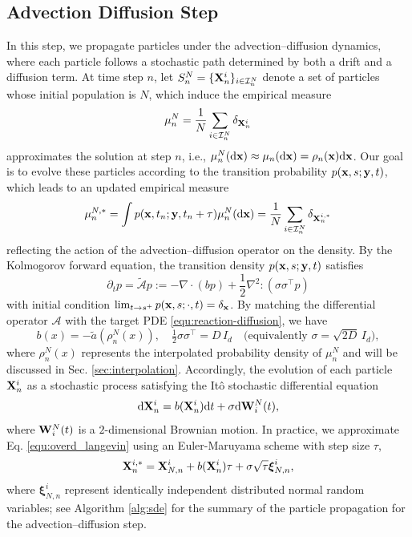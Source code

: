 \documentclass[a4paper,fleqn]{cas-sc}
\newcommand{\mhyphen}{\text{-}}
\theoremstyle{definition}
\theoremstyle{remark}
\begin{document}
\subsection{Advection Diffusion Step}
\label{sec:adevection_diffusion}
In this step, we propagate particles under the advection–diffusion dynamics, where each particle follows a stochastic path determined by both a drift and a diffusion term. At time step $n$, let $S^N_n = \{\mathbf{X}^i_n\}_{i\in \mathcal I^N_n}$ denote  a set of particles  whose initial population is $N$, which induce the empirical measure 
\[
\mu^N_n= \frac{1}{N}\sum_{i\in \mathcal I^N_n}\delta_{\mathbf{X}^i_n}
\] 
approximates the solution at step $n$, i.e.,  $\mu^N_n (\mathrm{d} \mathbf{x}) \approx \mu_n(\mathrm{d} \mathbf{x}) = \rho_n(\mathbf{x})\mathrm{d} \mathbf{x}$. 
Our goal is to evolve these particles according to the transition probability $p(\mathbf{x},s;\mathbf{y},t)$, which leads to an updated empirical measure
\[\mu^{N,*}_n = \int p(\mathbf{x},t_n;\mathbf{y},t_n+\tau)  \mu^N_n(\mathrm{d} \mathbf{x}) =   \frac{1}{N}\sum_{i\in \mathcal I^N_n}\delta_{\mathbf{X}^{i,*}_n}
\]  
reflecting the action of the advection--diffusion operator on the density.
By the Kolmogorov forward equation, the transition density $p(\mathbf{x},s;\mathbf{y},t)$ satisfies 
\begin{equation}
    \partial_t p = \tilde {\mathcal A }p := - \nabla \cdot(b  p) + \frac{1}{2}\nabla^2:(\sigma \sigma^\top p) 
\end{equation}
with initial condition $\lim_{t\to s^+} p(\mathbf{x},s;\cdot,t) = \delta_{\mathbf{x}}$. By matching the differential operator $\mathcal A$ with the target PDE \eqref{equ:reaction-diffusion}, we have 
\begin{equation}
    b(x) = -\tilde a(\rho^N_n(x)), \quad \tfrac{1}{2}\sigma \sigma^\top = D\,I_d
    \quad\text{(equivalently } \sigma=\sqrt{2D}\,I_d\text{)},
\end{equation}
where $\rho^N_n(x)$ represents the interpolated probability density of $\mu^N_n$ and will be discussed in Sec. \ref{sec:interpolation}.
%
Accordingly, the evolution of each particle $\mathbf{X}^i_n$ as a stochastic process satisfying the It\^o stochastic differential equation
\begin{equation}\label{equ:overd_langevin}
    \mathrm{d} \mathbf{X}^i_n = b(\mathbf{X}^i_n) \mathrm{d} t  + \sigma \mathrm{d} \mathbf{W}^N_i(t),
\end{equation}
where $\mathbf{W}^N_i(t)$ is a $2\mhyphen$dimensional Brownian motion. 
In practice, we approximate Eq. \eqref{equ:overd_langevin} using an Euler-Maruyama scheme with step size $\tau$, 
\begin{equation}
 \mathbf{X}^{i,*}_n = \mathbf{X}_{N,n}^{i} + b(\mathbf{X}^i_n) \tau  + \sigma \sqrt{\tau} \boldsymbol{\xi}^i_{N,n},
 \label{eq:euler_maruyama}
\end{equation}
where $\boldsymbol{\xi}^i_{N,n}$ represent identically independent distributed normal random variables; see Algorithm \ref{alg:sde} for the summary of the particle propagation for the advection--diffusion step. 
\end{document}
